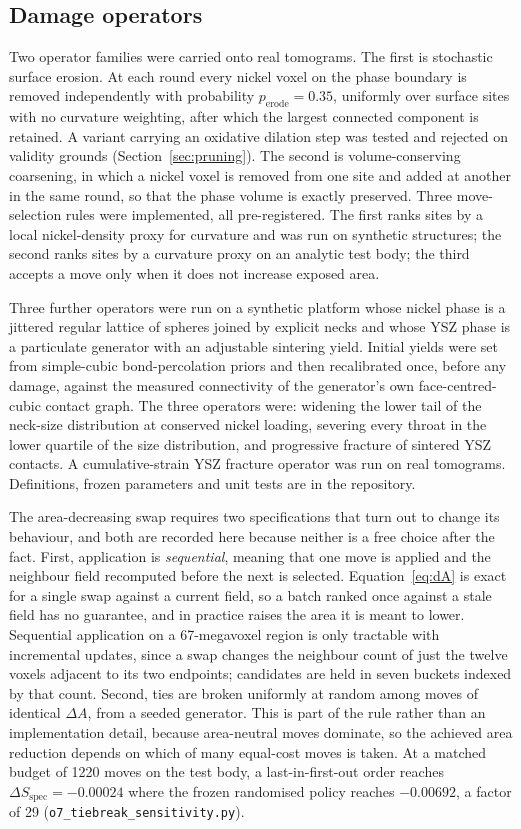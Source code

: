 \documentclass[5p,times,twocolumn]{elsarticle}
\newcommand{\Sspec}{S_{\mathrm{spec}}}
\begin{document}
\subsection{Damage operators}

Two operator families were carried onto real tomograms. The first is
stochastic surface erosion. At each round every nickel voxel on the phase
boundary is
removed independently with probability $p_{\mathrm{erode}}=0.35$, uniformly
over surface sites with no curvature weighting, after which the largest
connected component is retained. A variant carrying an oxidative dilation step
was tested and rejected on validity grounds (Section~\ref{sec:pruning}). The
second is volume-conserving coarsening, in which a nickel voxel is removed
from one site and added at another in the same round, so that the phase volume
is exactly preserved. Three move-selection rules were implemented, all
pre-registered. The first ranks sites by a local nickel-density proxy for
curvature and was run on synthetic structures; the second ranks sites by a
curvature proxy on an analytic test body; the third accepts a move only when
it does not increase exposed area.

Three further operators were run on a synthetic platform whose nickel
phase is a jittered regular lattice of spheres joined by explicit necks and
whose YSZ phase is a particulate generator with an adjustable sintering yield.
Initial yields were set from simple-cubic bond-percolation priors
\cite{lorenz1998} and then recalibrated once, before any damage, against the
measured connectivity of the generator's own face-centred-cubic contact graph.
The three operators were: widening the
lower tail of the neck-size distribution at conserved nickel loading,
severing every throat in the lower quartile of the size distribution, and
progressive fracture of sintered YSZ contacts. A cumulative-strain YSZ
fracture operator was run on real tomograms. Definitions, frozen parameters
and unit tests are in the repository.

The area-decreasing swap requires two specifications that turn out to change
its behaviour, and both are recorded here because neither is a free choice
after the fact. First, application is \emph{sequential}, meaning that one move is applied and
the neighbour field recomputed before the next is selected. Equation~\eqref{eq:dA} is exact for a single swap
against a current field, so a batch ranked once against a stale field has no
guarantee, and in practice raises the area it is meant to lower. Sequential
application on a 67-megavoxel region is only tractable with
incremental updates, since a swap changes the neighbour count of just the
twelve voxels adjacent to its two endpoints; candidates are held in seven
buckets indexed by that count. Second, ties are broken uniformly at
random among moves of identical $\Delta A$, from a seeded generator. This is
part of the rule rather than an implementation detail, because area-neutral
moves dominate,
so the achieved area reduction depends on which of many equal-cost moves is
taken. At a matched budget of 1220 moves on the test body, a
last-in-first-out order reaches $\Delta \Sspec = -0.00024$ where the frozen
randomised policy reaches $-0.00692$, a factor of 29
(\texttt{o7\_tiebreak\_sensitivity.py}).
\end{document}
